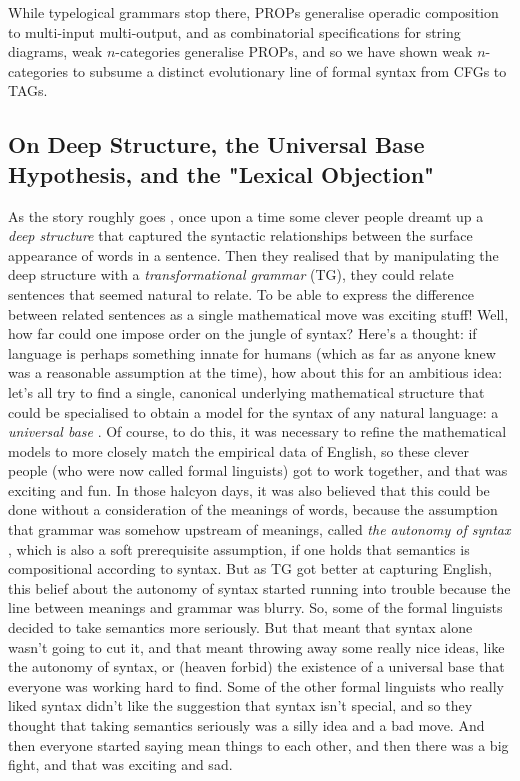 While typelogical grammars stop there, PROPs generalise operadic composition to multi-input multi-output, and as combinatorial specifications for string diagrams, weak $n$-categories generalise PROPs, and so we have shown weak $n$-categories to subsume a distinct evolutionary line of formal syntax from CFGs to TAGs.\\

\subsection{On Deep Structure, the Universal Base Hypothesis, and the "Lexical Objection"}

As the story roughly goes \citep{harrisLinguisticsWars1993}, once upon a time some clever people dreamt up a \emph{deep structure} that captured the syntactic relationships between the surface appearance of words in a sentence. Then they realised that by manipulating the deep structure with a \emph{transformational grammar} (TG), they could relate sentences that seemed natural to relate. To be able to express the difference between related sentences as a single mathematical move was exciting stuff! Well, how far could one impose order on the jungle of syntax? Here's a thought: if language is perhaps something innate for humans (which as far as anyone knew was a reasonable assumption at the time), how about this for an ambitious idea: let's all try to find a single, canonical underlying mathematical structure that could be specialised to obtain a model for the syntax of any natural language: a \emph{universal base} \citep{petersNoteUniversalBase1969}. Of course, to do this, it was necessary to refine the mathematical models to more closely match the empirical data of English, so these clever people (who were now called formal linguists) got to work together, and that was exciting and fun. In those halcyon days, it was also believed that this could be done without a consideration of the meanings of words, because the assumption that grammar was somehow upstream of meanings, called \emph{the autonomy of syntax} \citep{croftAutonomyFunctionalistLinguistics1995}, which is also a soft prerequisite assumption, if one holds that semantics is compositional according to syntax. But as TG got better at capturing English, this belief about the autonomy of syntax started running into trouble because the line between meanings and grammar was blurry. So, some of the formal linguists decided to take semantics more seriously. But that meant that syntax alone wasn't going to cut it, and that meant throwing away some really nice ideas, like the autonomy of syntax, or (heaven forbid) the existence of a universal base that everyone was working hard to find. Some of the other formal linguists who really liked syntax didn't like the suggestion that syntax isn't special, and so they thought that taking semantics seriously was a silly idea and a bad move. And then everyone started saying mean things to each other, and then there was a big fight, and that was exciting and sad.\\

